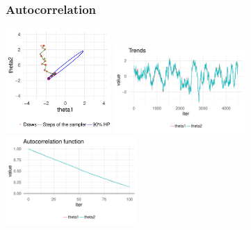 \documentclass[10pt]{beamer}
\begin{document}
\begin{frame}

\frametitle{Autocorrelation}

  \vspace{-0.5\baselineskip}
  \includegraphics[width=4cm]{figs/Metrop2.pdf}
  {\includegraphics[width=5cm]{figs/Metrop2trace.pdf}\\}
  {\includegraphics[width=5cm]{figs/Metrop2acf.pdf}}

\end{frame}
\end{document}
